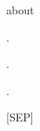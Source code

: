 \documentclass[varwidth=150mm]{standalone}
\begin{document}
\begin{CJK*}{UTF8}{gbsn}
{{{\colorbox{red!1.4148662090301514}{\strut about} \colorbox{red!2.477611541748047}{\strut .} \colorbox{red!6.144816875457764}{\strut .} \colorbox{red!62.55287170410156}{\strut .} \colorbox{red!1.2205313444137573}{\strut [SEP]}
}}}
\end{CJK*}
\end{document}
